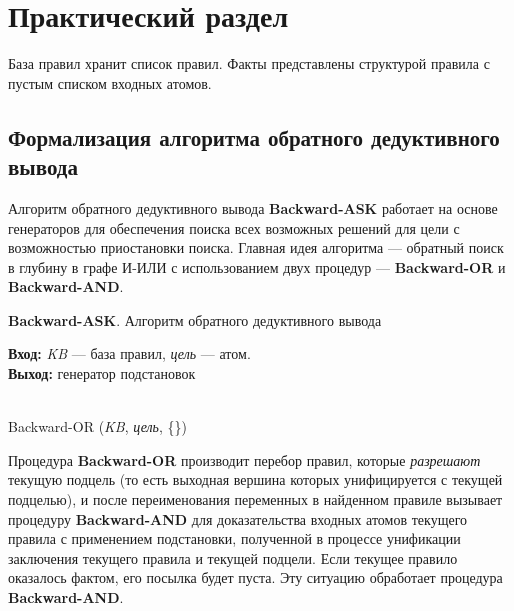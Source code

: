 \chapter{Практический раздел}

База правил хранит список правил. Факты представлены структурой правила с пустым списком входных атомов.

\section{Формализация алгоритма обратного дедуктивного вывода}

Алгоритм обратного дедуктивного вывода \textbf{Backward-ASK} работает на основе генераторов для обеспечения поиска всех возможных решений для цели с возможностью приостановки поиска. Главная идея алгоритма --- обратный поиск в глубину в графе И-ИЛИ с использованием двух процедур --- \textbf{Backward-OR} и \textbf{Backward-AND}.

\begin{algorithm}[h!]
  \caption{\textbf{Backward-ASK}. Алгоритм обратного дедуктивного вывода}
  \label{alg:backward-ask}
  \hspace*{\algorithmicindent} \textbf{Вход:} \textit{KB} --- база правил, \textit{цель} --- атом. \\
  \hspace*{\algorithmicindent} \textbf{Выход:} генератор подстановок
  \begin{algorithmic}[1]
  \\
  \Return Backward-OR (\textit{KB}, \textit{цель}, \{\})
  \end{algorithmic}
\end{algorithm}

Процедура \textbf{Backward-OR} производит перебор правил, которые \textit{разрешают} текущую подцель (то есть выходная вершина которых унифицируется с текущей подцелью), и после переименования переменных в найденном правиле вызывает процедуру \textbf{Backward-AND} для доказательства входных атомов текущего правила с применением подстановки, полученной в процессе унификации заключения текущего правила и текущей подцели. Если текущее правило оказалось фактом, его посылка будет пуста. Эту ситуацию обработает процедура \textbf{Backward-AND}.

